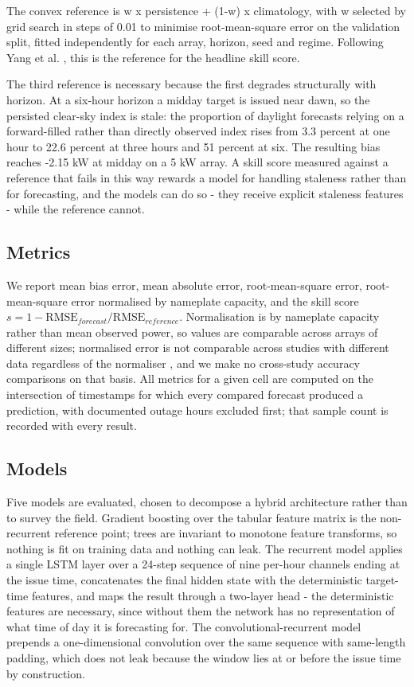 The convex reference is w x persistence + (1-w) x climatology, with w
selected by grid search in steps of 0.01 to minimise root-mean-square
error on the validation split, fitted independently for each array,
horizon, seed and regime. Following Yang et al. \cite{yang2020verification}, this is the
reference for the headline skill score.

The third reference is necessary because the first degrades structurally
with horizon. At a six-hour horizon a midday target is issued near dawn,
so the persisted clear-sky index is stale: the proportion of daylight
forecasts relying on a forward-filled rather than directly observed
index rises from 3.3 percent at one hour to 22.6 percent at three hours
and 51 percent at six. The resulting bias reaches -2.15 kW at midday on
a 5 kW array. A skill score measured against a reference that fails in
this way rewards a model for handling staleness rather than for
forecasting, and the models can do so - they receive explicit staleness
features - while the reference cannot.

\subsection{Metrics}
\label{sec:methodology-metrics}

We report mean bias error, mean absolute error, root-mean-square error,
root-mean-square error normalised by nameplate capacity, and the skill
score $s = 1 - \mathrm{RMSE}_{forecast} / \mathrm{RMSE}_{reference}$.
Normalisation is by nameplate capacity rather than mean observed power,
so values are comparable across arrays of different sizes; normalised
error is not comparable across studies with different data regardless
of the normaliser \cite{yang2020verification}, and we make no
cross-study accuracy comparisons on that basis. All metrics for a
given cell are computed on the intersection of timestamps for which
every compared forecast produced a prediction, with documented outage
hours excluded first; that sample count is recorded with every result.

\subsection{Models}
\label{sec:methodology-models}

Five models are evaluated, chosen to decompose a hybrid architecture
rather than to survey the field. Gradient boosting over the tabular
feature matrix is the non-recurrent reference point; trees are
invariant to monotone feature transforms, so nothing is fit on training
data and nothing can leak. The recurrent model applies a single LSTM
layer over a 24-step sequence of nine per-hour channels ending at the
issue time, concatenates the final hidden state with the deterministic
target-time features, and maps the result through a two-layer head -
the deterministic features are necessary, since without them the
network has no representation of what time of day it is forecasting
for. The con\-vo\-lu\-tion\-al-recurrent model prepends a
one-dimensional convolution over the same sequence with same-length
padding, which does not leak because the window lies at or before the
issue time by construction.

